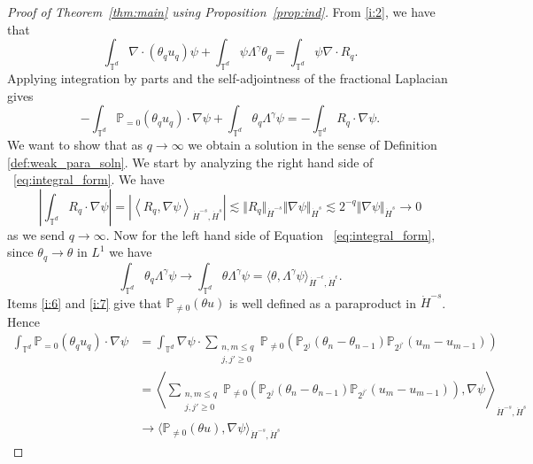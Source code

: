 \documentclass[12pt,reqno,letterpaper]{amsart}
\numberwithin{equation}{section}
\newcommand{\1}{{\bf 1}}
\newcommand{\2}{{\bf 2}}
\newcommand{\T}{\mathbb T}
\theoremstyle{remark}
\theoremstyle{remark}
\begin{document}
\begin{proof}[Proof of Theorem~\ref{thm:main} using Proposition~\ref{prop:ind}]
From \ref{i:2}, we have that
$$
\int_{\T^d} \nabla \cdot (\theta_q u_q) \psi + \int_{\T^d} \psi \Lambda^\gamma \theta_q = \int_{\T^d} \psi \nabla \cdot R_q.
$$
Applying integration by parts and the self-adjointness of the fractional Laplacian gives
\begin{equation}\label{eq:integral_form}
    -\int_{\T^d} \mathbb{P}_{= 0}(\theta_q u_q) \cdot \nabla \psi + \int_{\T^d} \theta_q \Lambda^\gamma \psi = - \int_{\T^d} R_q \cdot \nabla \psi.
\end{equation}
We want to show that as $q \to \infty$ we obtain a solution in the sense of Definition \ref{def:weak_para_soln}. We start by analyzing the right hand side of ~\eqref{eq:integral_form}. We have
\begin{equation}\label{eq:stress_est}
    \left|\int_{\T^d} R_q \cdot \nabla \psi\right| = \left|\left\langle R_q, \nabla \psi\right\rangle_{\dot{H}^{-s},\dot{H}^s}\right| \lesssim \Vert R_q \Vert_{\dot{H}^{-s}} \Vert \nabla \psi \Vert_{\dot{H}^s} \lesssim 2^{-q} \Vert \nabla \psi \Vert_{\dot{H}^s} \to 0
\end{equation}
as we send $q \to \infty$. Now for the left hand side of Equation ~\eqref{eq:integral_form}, since $\theta_q \to \theta$ in $L^1$ we have
\begin{equation}\label{eq:L1_conv}
    \int_{\T^d} \theta_q \Lambda^\gamma \psi \to \int_{\T^d} \theta \Lambda^\gamma \psi = \langle \theta, \Lambda^\gamma \psi\rangle_{\dot{H}^{-\epsilon},\dot{H}^{\epsilon}}.
\end{equation}
Items \ref{i:6} and \ref{i:7} give that $\mathbb{P}_{\not=0}(\theta u)$ is well defined as a paraproduct in $\dot{H}^{-s}$. Hence
\begin{equation}\label{eq:nonlin_term}
    \begin{split}
        \int_{\T^d} \mathbb{P}_{= 0}(\theta_q u_q) \cdot \nabla \psi &= \int_{\T^d} \nabla \psi \cdot \sum_{\substack{n,m \leq q\\ j,j' \geq 0}} \mathbb{P}_{\not = 0}\left(\mathbb{P}_{2^j}(\theta_n - \theta_{n-1}) \mathbb{P}_{2^{j'}}(u_{m} - u_{m-1})\right)\\
        &= \left\langle \sum_{\substack{n,m \leq q\\ j,j' \geq 0}} \mathbb{P}_{\not = 0}\left(\mathbb{P}_{2^j}(\theta_n - \theta_{n-1}) \mathbb{P}_{2^{j'}}(u_{m} - u_{m-1})\right), \nabla \psi\right\rangle_{\dot{H}^{-s},\dot{H}^s}\\
        &\to \langle \mathbb{P}_{\not=0}(\theta u), \nabla \psi\rangle_{\dot{H}^{-s},\dot{H}^s}
    \end{split}

\end{equation}
\end{proof}
\end{document}

